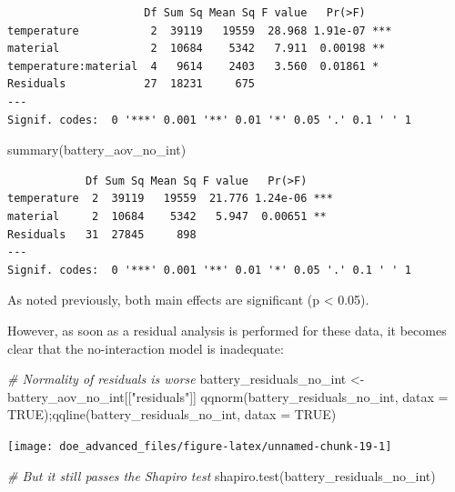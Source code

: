 \documentclass[
]{book}
\newenvironment{Shaded}{\begin{snugshade}}{\end{snugshade}}
\newcommand{\AttributeTok}[1]{\textcolor[rgb]{0.77,0.63,0.00}{#1}}
\newcommand{\CommentTok}[1]{\textcolor[rgb]{0.56,0.35,0.01}{\textit{#1}}}
\newcommand{\ConstantTok}[1]{\textcolor[rgb]{0.00,0.00,0.00}{#1}}
\newcommand{\FunctionTok}[1]{\textcolor[rgb]{0.00,0.00,0.00}{#1}}
\newcommand{\NormalTok}[1]{#1}
\newcommand{\OtherTok}[1]{\textcolor[rgb]{0.56,0.35,0.01}{#1}}
\newcommand{\StringTok}[1]{\textcolor[rgb]{0.31,0.60,0.02}{#1}}
\begin{document}
\begin{verbatim}
                     Df Sum Sq Mean Sq F value   Pr(>F)    
temperature           2  39119   19559  28.968 1.91e-07 ***
material              2  10684    5342   7.911  0.00198 ** 
temperature:material  4   9614    2403   3.560  0.01861 *  
Residuals            27  18231     675                     
---
Signif. codes:  0 '***' 0.001 '**' 0.01 '*' 0.05 '.' 0.1 ' ' 1
\end{verbatim}

\begin{Shaded}
\begin{Highlighting}[]
\FunctionTok{summary}\NormalTok{(battery\_aov\_no\_int)}
\end{Highlighting}
\end{Shaded}

\begin{verbatim}
            Df Sum Sq Mean Sq F value   Pr(>F)    
temperature  2  39119   19559  21.776 1.24e-06 ***
material     2  10684    5342   5.947  0.00651 ** 
Residuals   31  27845     898                     
---
Signif. codes:  0 '***' 0.001 '**' 0.01 '*' 0.05 '.' 0.1 ' ' 1
\end{verbatim}

As noted previously, both main effects are significant (p \textless{} 0.05).

However, as soon as a residual analysis is performed for these data, it becomes clear that the no-interaction model is inadequate:

\begin{Shaded}
\begin{Highlighting}[]
\CommentTok{\# Normality of residuals is worse}
\NormalTok{battery\_residuals\_no\_int }\OtherTok{\textless{}{-}}\NormalTok{ battery\_aov\_no\_int[[}\StringTok{"residuals"}\NormalTok{]]}
\FunctionTok{qqnorm}\NormalTok{(battery\_residuals\_no\_int, }\AttributeTok{datax =} \ConstantTok{TRUE}\NormalTok{);}\FunctionTok{qqline}\NormalTok{(battery\_residuals\_no\_int, }\AttributeTok{datax =} \ConstantTok{TRUE}\NormalTok{)}
\end{Highlighting}
\end{Shaded}

\texttt{[image: doe\_advanced\_files/figure-latex/unnamed-chunk-19-1]}

\begin{Shaded}
\begin{Highlighting}[]
\CommentTok{\# But it still passes the Shapiro test}
\FunctionTok{shapiro.test}\NormalTok{(battery\_residuals\_no\_int)}
\end{Highlighting}
\end{Shaded}
\end{document}
